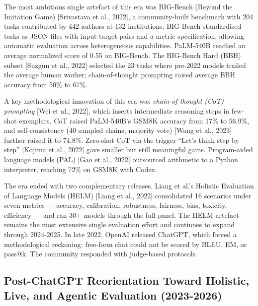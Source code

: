The most ambitious single artefact of this era was BIG-Bench (Beyond the Imitation Game) {[}Srivastava et al., 2022{]}, a community-built benchmark with 204 tasks contributed by 442 authors at 132 institutions. BIG-Bench standardised tasks as JSON files with input-target pairs and a metric specification, allowing automatic evaluation across heterogeneous capabilities. PaLM-540B reached an average normalized score of 0.55 on BIG-Bench. The BIG-Bench Hard (BBH) subset {[}Suzgun et al., 2022{]} selected the 23 tasks where pre-2022 models trailed the average human worker; chain-of-thought prompting raised average BBH accuracy from 50\% to 67\%.

A key methodological innovation of this era was \emph{chain-of-thought (CoT) prompting} {[}Wei et al., 2022{]}, which inserts intermediate reasoning steps in few-shot exemplars. CoT raised PaLM-540B's GSM8K accuracy from 17\% to 56.9\%, and self-consistency (40 sampled chains, majority vote) {[}Wang et al., 2023{]} further raised it to 74.8\%. Zero-shot CoT via the trigger ``Let's think step by step'' {[}Kojima et al., 2022{]} gave smaller but still meaningful gains. Program-aided language models (PAL) {[}Gao et al., 2022{]} outsourced arithmetic to a Python interpreter, reaching 72\% on GSM8K with Codex.

The era ended with two complementary releases. Liang et al.'s Holistic Evaluation of Language Models (HELM) {[}Liang et al., 2022{]} consolidated 16 scenarios under seven metrics --- accuracy, calibration, robustness, fairness, bias, toxicity, efficiency --- and ran 30+ models through the full panel. The HELM artefact remains the most extensive single evaluation effort and continues to expand through 2024-2025. In late 2022, OpenAI released ChatGPT, which forced a methodological reckoning: free-form chat could not be scored by BLEU, EM, or pass@k. The community responded with judge-based protocols.

\subsection{Post-ChatGPT Reorientation Toward Holistic, Live, and Agentic Evaluation (2023-2026)}\label{post-chatgpt-reorientation-toward-holistic-live-and-agentic-evaluation-2023-2026}

